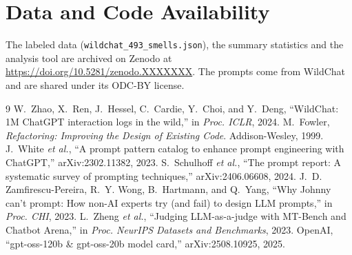 \documentclass[conference]{IEEEtran}
\begin{document}
\section*{Data and Code Availability}
The labeled data (\texttt{wildchat\_493\_smells.json}), the summary statistics
and the analysis tool are archived on Zenodo at
\url{https://doi.org/10.5281/zenodo.XXXXXXX}. The prompts come from WildChat and
are shared under its ODC-BY license.

\begin{thebibliography}{9}
 W.~Zhao, X.~Ren, J.~Hessel, C.~Cardie, Y.~Choi, and Y.~Deng,
``WildChat: 1M ChatGPT interaction logs in the wild,'' in \emph{Proc. ICLR}, 2024.
 M.~Fowler, \emph{Refactoring: Improving the Design of Existing
Code}. Addison-Wesley, 1999.
 J.~White \emph{et al.}, ``A prompt pattern catalog to enhance
prompt engineering with ChatGPT,'' arXiv:2302.11382, 2023.
 S.~Schulhoff \emph{et al.}, ``The prompt report: A
systematic survey of prompting techniques,'' arXiv:2406.06608, 2024.
 J.~D. Zamfirescu-Pereira, R.~Y. Wong, B.~Hartmann, and Q.~Yang,
``Why Johnny can't prompt: How non-AI experts try (and fail) to design LLM
prompts,'' in \emph{Proc. CHI}, 2023.
 L.~Zheng \emph{et al.}, ``Judging LLM-as-a-judge with MT-Bench and
Chatbot Arena,'' in \emph{Proc. NeurIPS Datasets and Benchmarks}, 2023.
 OpenAI, ``gpt-oss-120b \& gpt-oss-20b model card,''
arXiv:2508.10925, 2025.
\end{thebibliography}
\end{document}
